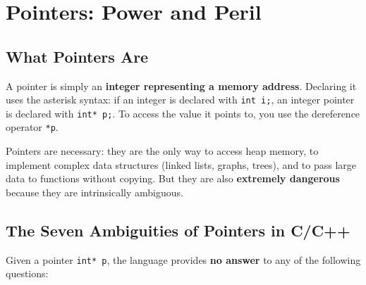 \section{Pointers: Power and Peril}

\subsection{What Pointers Are}

A pointer is simply an \textbf{integer representing a memory address}. Declaring it uses the asterisk syntax: if an integer is declared with \texttt{int i;}, an integer pointer is declared with \texttt{int* p;}. To access the value it points to, you use the dereference operator \texttt{*p}.

Pointers are necessary: they are the only way to access heap memory, to implement complex data structures (linked lists, graphs, trees), and to pass large data to functions without copying. But they are also \textbf{extremely dangerous} because they are intrinsically ambiguous.

\subsection{The Seven Ambiguities of Pointers in C/C++}

Given a pointer \texttt{int* p}, the language provides \textbf{no answer} to any of the following questions:

